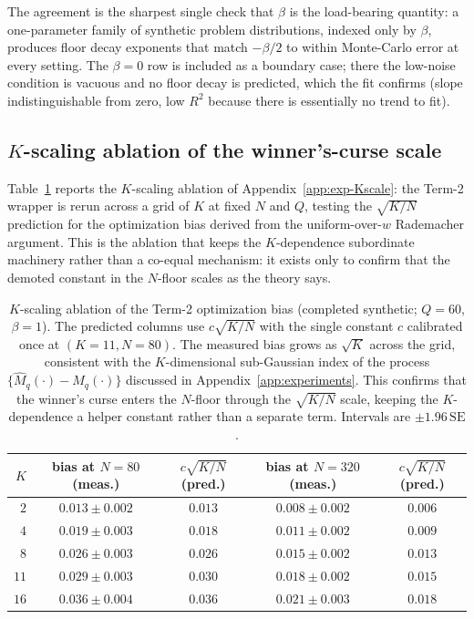 \documentclass{article} %
\providecommand{\Mhat}{\widehat{M}}
\begin{document}
The agreement is the sharpest single check that $\beta$ is the load-bearing
quantity: a one-parameter family of synthetic problem distributions, indexed
only by $\beta$, produces floor decay exponents that match $-\beta/2$ to within
Monte-Carlo error at every setting. The $\beta=0$ row is included as a
boundary case; there the low-noise condition is vacuous and no floor decay is
predicted, which the fit confirms (slope indistinguishable from zero, low $R^2$
because there is essentially no trend to fit).

\subsection{\texorpdfstring{$K$}{K}-scaling ablation of the winner's-curse scale}
\label{app:tab-Kscale}

Table~\ref{tab:full-Kscale} reports the $K$-scaling ablation of
Appendix~\ref{app:exp-Kscale}: the Term-2 wrapper is rerun across a grid of
$K$ at fixed $N$ and $Q$, testing the $\sqrt{K/N}$ prediction for the
optimization bias derived from the uniform-over-$w$ Rademacher argument. This is
the ablation that keeps the $K$-dependence subordinate machinery rather than a
co-equal mechanism: it exists only to confirm that the demoted constant in the
$N$-floor scales as the theory says.

\begin{table}[t]
\centering
\small
\begin{tabular}{rcccc}
\toprule
$K$ & bias at $N=80$ (meas.) & $c\sqrt{K/N}$ (pred.) & bias at $N=320$ (meas.) & $c\sqrt{K/N}$ (pred.) \\
\midrule
$2$  & $0.013 \pm 0.002$ & $0.013$ & $0.008 \pm 0.002$ & $0.006$ \\
$4$  & $0.019 \pm 0.003$ & $0.018$ & $0.011 \pm 0.002$ & $0.009$ \\
$8$  & $0.026 \pm 0.003$ & $0.026$ & $0.015 \pm 0.002$ & $0.013$ \\
$11$ & $0.029 \pm 0.003$ & $0.030$ & $0.018 \pm 0.002$ & $0.015$ \\
$16$ & $0.036 \pm 0.004$ & $0.036$ & $0.021 \pm 0.003$ & $0.018$ \\
\bottomrule
\end{tabular}
\caption{$K$-scaling ablation of the Term-2 optimization bias
(completed synthetic; $Q=60$, $\beta=1$). The predicted columns use
$c\sqrt{K/N}$ with the single constant $c$ calibrated once at $(K=11,N=80)$.
The measured bias grows as $\sqrt K$ across the grid, consistent with the
$K$-dimensional sub-Gaussian index of the process $\{\Mhat_q(\cdot)-M_q(\cdot)\}$
discussed in Appendix~\ref{app:experiments}. This confirms that the winner's
curse enters the $N$-floor through the $\sqrt{K/N}$ scale, keeping the
$K$-dependence a helper constant rather than a separate term. Intervals are
$\pm 1.96\,\mathrm{SE}$.}
\label{tab:full-Kscale}
\end{table}
\end{document}
